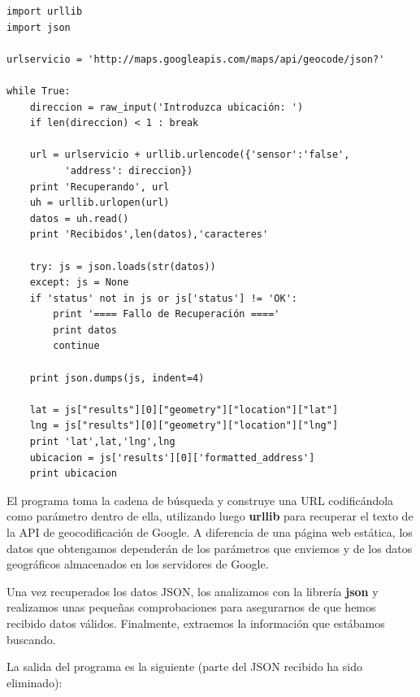 \beforeverb
\begin{verbatim}
import urllib
import json

urlservicio = 'http://maps.googleapis.com/maps/api/geocode/json?'

while True:
    direccion = raw_input('Introduzca ubicación: ')
    if len(direccion) < 1 : break

    url = urlservicio + urllib.urlencode({'sensor':'false', 
          'address': direccion})
    print 'Recuperando', url
    uh = urllib.urlopen(url)
    datos = uh.read()
    print 'Recibidos',len(datos),'caracteres'

    try: js = json.loads(str(datos))
    except: js = None
    if 'status' not in js or js['status'] != 'OK':
        print '==== Fallo de Recuperación ===='
        print datos
        continue

    print json.dumps(js, indent=4)

    lat = js["results"][0]["geometry"]["location"]["lat"]
    lng = js["results"][0]["geometry"]["location"]["lng"]
    print 'lat',lat,'lng',lng
    ubicacion = js['results'][0]['formatted_address']
    print ubicacion
\end{verbatim}
\afterverb
%
El programa toma la cadena de búsqueda y construye una URL
codificándola como parámetro dentro de ella, utilizando luego
{\bf urllib} para recuperar el texto de la API de geocodificación de Google.
A diferencia de una página web estática, los datos que obtengamos dependerán de los
parámetros que enviemos y de los datos geográficos almacenados en los servidores de Google.

Una vez recuperados los datos JSON, los analizamos con la librería
{\bf json} y realizamos unas pequeñas comprobaciones para asegurarnos de que hemos recibido
datos válidos. Finalmente, extraemos la información que estábamos buscando.

La salida del programa es la siguiente (parte del JSON recibido
ha sido eliminado):

